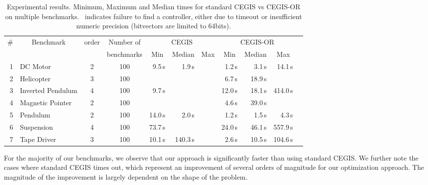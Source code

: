 \documentclass[sigconf]{llncs}
\newcommand{\xmark}{\ding{55}}
\begin{document}
\begin{table}
\centering
\footnotesize
%
\begin{tabular}{| r | l | c | c | r | r | r | r | r | r | r |}
%
\hline
\# & \multicolumn{1}{|c|}{Benchmark} & \multicolumn{1}{|c|}{order} & \multicolumn{1}{|c|}{Number of} & \multicolumn{3}{|c|}{CEGIS} & \multicolumn{3}{|c|}{CEGIS-OR} \\
   &                                 & & \multicolumn{1}{|c|}{benchmarks}  & \multicolumn{1}{|c|}{Min} & \multicolumn{1}{|c|}{Median} & \multicolumn{1}{|c|}{Max} & \multicolumn{1}{|c|}{Min} & \multicolumn{1}{|c|}{Median} & \multicolumn{1}{|c|}{Max}\\\hline
1  & DC Motor          & 2 & 100 & 9.5\,s & 1.9\,s& \xmark& 1.2\,s &   3.1\,s &   14.1\,s\\
2  & Helicopter        & 3  & 100 & \xmark & \xmark & \xmark & 6.7\,s  &   18.9\,s & \xmark\\
3  & Inverted Pendulum & 4 & 100 &   9.7\,s & \xmark &\xmark & 12.0\,s  &  18.1\,s &  414.0\,s\\
4  & Magnetic Pointer  & 2  & 100 & \xmark & \xmark & \xmark& 4.6\,s  &  39.0\,s &  \xmark \\
5  & Pendulum          & 2 & 100 & 14.0\,s & 2.0\,s & \xmark&1.2\,s  &   1.5\,s &   4.3\,s\\
6  & Suspension        & 4 & 100 & 73.7\,s& \xmark & \xmark &24.0\,s  &   46.1\,s &  557.9\,s\\
7  & Tape Driver       & 3 & 100 & 10.1\,s& 140.3\,s & \xmark &2.6\,s  &   10.5\,s &   104.6\,s\\
\hline
%
\end{tabular}
\vspace{0.05in}
\caption{\label{tab:cegis_results}
Experimental results. Minimum, Maximum and Median times for standard CEGIS vs CEGIS-OR on multiple benchmarks. \xmark~indicates failure to find a controller, either due to timeout or insufficient numeric precision (bitvectors are limited to 64bits).}
\end{table}

For the majority of our benchmarks, we observe that our approach is
significantly faster than using standard CEGIS. We further note the cases where
standard CEGIS times out, which represent an improvement of several orders of
magnitude for our optimization approach.  The magnitude of the improvement is 
largely dependent on the shape of the problem. 
\end{document}
